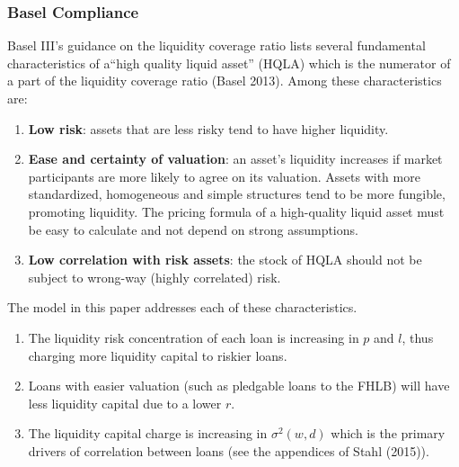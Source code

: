 \documentclass[12pt]{article}
\theoremstyle{definition}
\begin{document}
\subsubsection{Basel Compliance}

Basel III's guidance on the liquidity coverage ratio lists several fundamental characteristics of a``high quality liquid asset'' (HQLA) which is the numerator of a part of the liquidity coverage ratio (Basel 2013).  Among these characteristics are:

\begin{enumerate}
\item \textbf{Low risk}: assets that are less risky tend to have higher liquidity.
\item \textbf{Ease and certainty of valuation}: an asset's liquidity increases if market participants are more likely to agree on its valuation.  Assets with more standardized, homogeneous and simple structures tend to be more fungible, promoting liquidity.  The pricing formula of a high-quality liquid asset must be easy to calculate and not depend on strong assumptions.
\item \textbf{Low correlation with risk assets}: the stock of HQLA should not be subject to wrong-way (highly correlated) risk.
\end{enumerate}
The model in this paper addresses each of these characteristics.  
\begin{enumerate}
\item The liquidity risk concentration of each loan is increasing in \(p\) and \(l\), thus charging more liquidity capital to riskier loans. 
\item Loans with easier valuation (such as pledgable loans to the FHLB) will have less liquidity capital due to a lower \(r\).  
\item The liquidity capital charge is increasing in \(\sigma^2 (w, d)\)  which is the primary drivers of correlation between loans (see the appendices of Stahl (2015)).
\end{enumerate}
\end{document}
